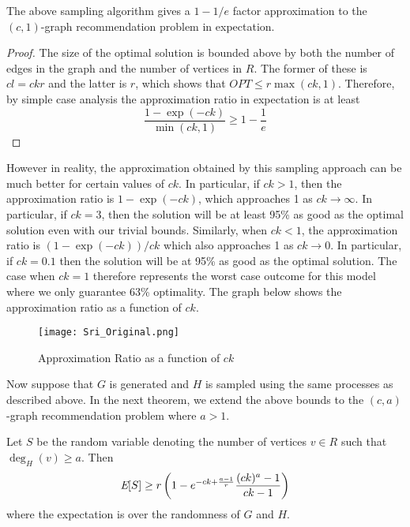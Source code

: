 \begin{thm}
The above sampling algorithm gives a $1-1/e$ factor approximation to the $(c,1)$-graph recommendation problem in expectation.
\end{thm}
\begin{proof}
The size of the optimal solution is bounded above by both the number
of edges in the graph and the number of vertices in $R$. The former of
these is $cl=ckr$ and the latter is $r$, which shows that $OPT \leq
r\max(ck,1)$. Therefore, by simple case analysis the approximation ratio in
expectation is at least
\[ \frac{1-\exp(-ck)}{\min(ck,1)} \geq 1-\frac{1}{e} \]
\end{proof}

However in reality, the approximation obtained by this sampling
approach can be much better for certain values of $ck$. In particular,
if $ck>1$, then the approximation ratio is $1-\exp(-ck)$, which
approaches 1 as $ck\to\infty$. In particular, if $ck=3$, then the
solution will be at least 95\% as good as the optimal solution even
with our trivial bounds. Similarly, when $ck<1$, the approximation
ratio is $(1-\exp(-ck))/ck$ which also approaches 1 as $ck\to 0$. In
particular, if $ck=0.1$ then the solution will be at 95\% as good as
the optimal solution. The case when $ck=1$ therefore represents the
worst case outcome for this model where we only guarantee 63\%
optimality. The graph below shows the approximation ratio as a
function of $ck$.\vs

\begin{figure}[h]
\centering
\texttt{[image: Sri\_Original.png]}
\caption{Approximation Ratio as a function of $ck$ }
\end{figure}

Now suppose that $G$ is generated and $H$ is sampled using the same
processes as described above. In the next theorem, we extend the above
bounds to the $(c,a)$-graph recommendation problem where $a>1$.

\begin{thm}
Let $S$ be the random variable denoting the number of vertices $v \in R$ such that $\deg_{H}(v)\geq a$. Then
\[ \emph{\text{E}}[S] \geq r\left(1-e^{-ck+\frac{a-1}{r}}\frac{(ck)^a-1}{ck-1}\right)  \]
where the expectation is over the randomness of $G$ and $H$.
\end{thm}


